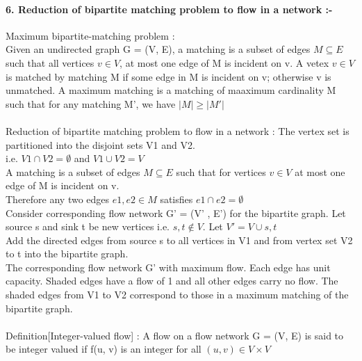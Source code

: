 \documentclass[a4paper,12pt]{article}
\begin{document}
	    
	    
	    \paragraph*{6. Reduction of bipartite matching problem to flow in a network :- \\ }
	    {
	           Maximum bipartite-matching problem :  \\
	           
	           Given an undirected graph G = (V, E), a matching is a subset of edges $ M\subseteq E$ such that all vertices $ v \in V $, at most one edge of M  is  incident on v. A vetex $ v \in V $ is matched by matching M if some edge in M is incident on v; otherwise v is unmatched. A maximum matching  is a matching of maaximum  cardinality M such that for any matching M', we have $ |M| \geq |M'|  $  \\
	           \\
	           
	           
	           
	           Reduction of bipartite matching problem to flow in a network :  The vertex set is partitioned into the disjoint sets V1 and V2. \\
	           i.e. $ V1 \cap V2 = \emptyset$ and $ V1 \cup V2 = V $  \\
	           
	           A matching is a subset of edges $ M \subseteq E $ such that for vertices $ v \in V $ at most one edge of M is incident on v.  \\
	           Therefore any two edges $ e1, e2 \in M  $ satisfies $ e1 \cap e2 = \emptyset$     \\
	           
	           Consider corresponding flow network G' = (V' , E') for the bipartite graph. Let source s and sink t be new vertices i.e. $ s, t \notin V $. Let $ V' = V \cup {s, t} $  \\
	           
	           Add the directed edges from source s to all vertices in V1 and from vertex set V2 to t into the bipartite graph.   \\
	           
	           
	                
	           
	           The corresponding flow network G' with maximum flow. Each edge has unit capacity. Shaded edges have  a flow of 1 and all other edges carry no flow. The shaded edges from V1 to V2 correspond to those in a maximum matching of the bipartite graph.  \\  \\
	           
	           Definition[Integer-valued flow] : A flow on a flow network G = (V, E) is said to be integer valued if f(u, v) is an integer for all $ (u, v) \in V \times V $    
	      
	       	 
	    
	    }
	    
\end{document}
